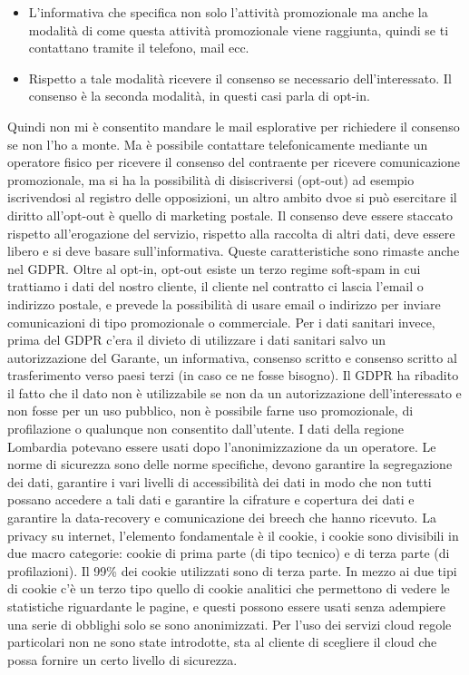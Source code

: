 \documentclass[a4page, 11pt, twocolumn]{article}
\begin{document}
\begin{itemize}
	\item L’informativa che specifica non solo l’attività promozionale ma anche la modalità di come questa attività promozionale viene raggiunta, quindi se ti contattano tramite il telefono, mail ecc. 
	\item Rispetto a tale modalità ricevere il consenso se necessario dell’interessato. Il consenso è la seconda modalità, in questi casi parla di opt-in.
\end{itemize}
Quindi non mi è consentito mandare le mail esplorative per richiedere il consenso se non l’ho a monte. Ma è possibile contattare telefonicamente mediante un operatore fisico per ricevere il consenso del contraente per ricevere comunicazione promozionale, ma si ha la possibilità di disiscriversi (opt-out) ad esempio iscrivendosi al registro delle opposizioni, un altro ambito dvoe si può esercitare il diritto all’opt-out è quello di marketing postale.\newline
Il consenso deve essere staccato rispetto all’erogazione del servizio, rispetto alla raccolta di altri dati, deve essere libero e si deve basare sull’informativa. Queste caratteristiche sono rimaste anche nel GDPR. \newline
Oltre al opt-in, opt-out esiste un terzo regime soft-spam in cui trattiamo i dati del nostro cliente, il cliente nel contratto ci lascia l’email o indirizzo postale, e prevede la possibilità di usare email o indirizzo per inviare comunicazioni di tipo promozionale o commerciale.\newline
Per i dati sanitari invece, prima del GDPR c’era il divieto di utilizzare i dati sanitari salvo un autorizzazione del Garante, un informativa, consenso scritto e consenso scritto al trasferimento verso paesi terzi (in caso ce ne fosse bisogno). Il GDPR ha ribadito il fatto che il dato non è utilizzabile se non da un autorizzazione dell’interessato e non fosse per un uso pubblico, non è possibile farne uso promozionale, di profilazione o qualunque non consentito dall’utente. I dati della regione Lombardia potevano essere usati dopo l’anonimizzazione da un operatore. Le norme di sicurezza sono delle norme specifiche, devono garantire la segregazione dei dati, garantire i vari livelli di accessibilità dei dati in modo che non tutti possano accedere a tali dati e garantire la cifrature e copertura dei dati e garantire la data-recovery e comunicazione dei breech che hanno ricevuto. \newline
La privacy su internet, l’elemento fondamentale è il cookie, i cookie sono divisibili in due macro categorie: cookie di prima parte (di tipo tecnico) e di terza parte (di profilazioni). Il 99\% dei cookie utilizzati sono di terza parte. In mezzo ai due tipi di cookie c’è un terzo tipo quello di cookie analitici che permettono di vedere le statistiche riguardante le pagine, e questi possono essere usati senza adempiere una serie di obblighi solo se sono anonimizzati. Per l’uso dei servizi cloud regole particolari non ne sono state introdotte, sta al cliente di scegliere il cloud che possa fornire un certo livello di sicurezza.\newline
\end{document}
